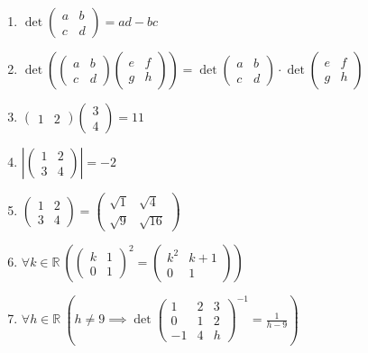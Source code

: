 \documentclass[11pt,a4paper]{article}
\begin{document}
\begin{enumerate}
\item $\displaystyle \det \begin{pmatrix} a & b \\ c & d \end{pmatrix} = ad - bc$
\item $\displaystyle \det\left( \begin{pmatrix} a & b \\ c & d \end{pmatrix} \begin{pmatrix} e & f \\ g & h \end{pmatrix} \right) = \det \begin{pmatrix} a & b \\ c & d \end{pmatrix} \cdot \det \begin{pmatrix} e & f \\ g & h \end{pmatrix}$
\item $\displaystyle \begin{pmatrix} 1 & 2 \end{pmatrix} \begin{pmatrix} 3 \\ 4 \end{pmatrix} = 11$
\item $\displaystyle \left| \begin{pmatrix} 1 & 2 \\ 3 & 4 \end{pmatrix} \right| = -2$
\item $\displaystyle \begin{pmatrix} 1 & 2 \\ 3 & 4 \end{pmatrix} = \begin{pmatrix} \sqrt{1} & \sqrt{4} \\ \sqrt{9} & \sqrt{16} \end{pmatrix}$
\item $\displaystyle \forall k \in \mathbb{R}\ \left( \begin{pmatrix} k & 1 \\ 0 & 1 \end{pmatrix}^{2} = \begin{pmatrix} k^{2} & k + 1 \\ 0 & 1 \end{pmatrix} \right)$
\item $\displaystyle \forall h \in \mathbb{R}\ \left( h \neq 9 \implies \det \begin{pmatrix} 1 & 2 & 3 \\ 0 & 1 & 2 \\ -1 & 4 & h \end{pmatrix}^{-1} = \frac{1}{h - 9} \right)$

\end{enumerate}
\end{document}
